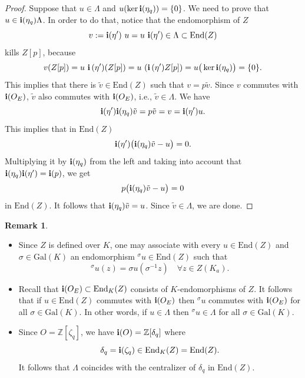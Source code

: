 \documentclass[12pt,a4paper,reqno]{amsart}
\def\Z{{\mathbb Z}}
\def\Gal{\mathrm{Gal}}
\def\End{\mathrm{End}}
\theoremstyle{definition}
\newtheorem{rem}[thm]{Remark}
\begin{document}
\begin{proof}
Suppose that $u \in \Lambda$ and $u(\ker {\bf i}(\eta_q))=\{0\}$. We need to prove that $u \in {\bf i}(\eta_q)\Lambda$.
In order to do that, notice that the endomorphism of $Z$
$$v:={\bf i}(\eta^{\prime})\ u=u \ {\bf i}(\eta^{\prime})\in \Lambda \subset \End(Z)$$
 kills $Z[p]$, because
$$v(Z[p])=u\ {\bf i}\left(\eta^{\prime})(Z[p]\right)= u \ ({\bf i}\left(\eta^{\prime})Z[p]\right)=u\big(\ker {\bf i}(\eta_q)\big)=\{0\}.$$
This implies that there is $\tilde{v} \in \End(Z)$ such that $v=p \tilde{v}$. Since $v$ commutes with ${\bf i}(O_E)$,
$\tilde{v}$ also commutes with ${\bf i}(O_E)$, i.e., $\tilde{v}\in \Lambda$. We have
$${\bf i}(\eta^{\prime}){\bf i}(\eta_q) \tilde{v}=p \tilde{v}=v={\bf i}(\eta^{\prime})u.$$
This implies that in $\End(Z)$
$${\bf i}(\eta^{\prime})\big({\bf i}(\eta_q) \tilde{v}-u\big)=0.$$
Multiplying it by ${\bf i}(\eta_q)$ from the left and taking into account that ${\bf i}(\eta_q){\bf i}(\eta^{\prime})={\bf i}(p)$, we get
$$p\big({\bf i}(\eta_q) \tilde{v}-u\big)=0$$
in $\End(Z)$.  It follows that 
 ${\bf i}(\eta_q) \tilde{v}=u$.
Since $\tilde{v}\in \Lambda$, we are done.
\end{proof}

\begin{rem}
\label{normalZ}
\begin{itemize}
\item[(i)]
Since $Z$ is defined over $K$, one may associate with every $u\in \End(Z)$ and $ \sigma \in \Gal(K)$ an endomorphism $^{\sigma}u \in \End(Z)$ such that 
\begin{equation}
\label{uSigma}
^{\sigma}u(z)=\sigma
u(\sigma^{-1}z) \quad \forall z \in Z(K_a).
\end{equation}
\item[(ii)]
Recall  that ${\bf i}(O_E)\subset \End_K(Z)$ consists of $K$-endomorphisms of $Z$. It follows that if $u \in \End(Z)$ commutes with  ${\bf i}(O_E)$ then 
$^{\sigma}u$ commutes with ${\bf i}(O_E)$ for all $\sigma \in \Gal(K)$. In other words, if $u \in \Lambda$ then $^{\sigma}u\in \Lambda$ for all $\sigma \in \Gal(K)$.
\item[(iii)] Since $O=\Z[\zeta_q]$, we have ${\bf i}(O)=\Z[\delta_q]$ where
\begin{equation}
\label{deltaQ}
\delta_q={\bf i}(\zeta_q)\in \End_K(Z)=\End(Z).
\end{equation}
It follows that $\Lambda$ coincides with the centralizer of $\delta_q$ in $\End(Z)$.
\end{itemize}
\end{rem}
\end{document}
